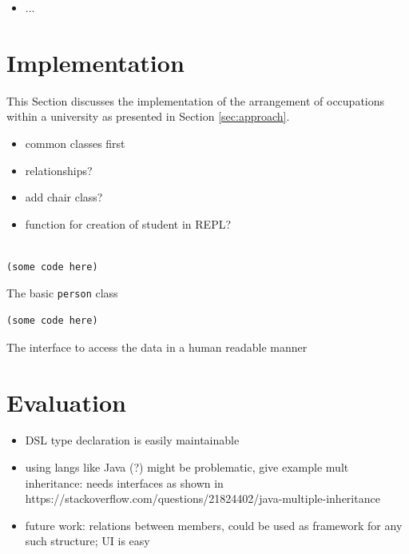 \documentclass[oribibl]{llncs}
\begin{document}
\begin{itemize}
\item ...
\end{itemize}


\section{Implementation}
\label{sec:implementation}

This Section discusses the implementation of the arrangement of occupations within a university as presented in Section \ref{sec:approach}. 

\begin{itemize}
\item common classes first
\item relationships?
\item add chair class?
\item function for creation of student in REPL?

\end{itemize}

\begin{listing}[]%
\begin{verbatim}

(some code here)
\end{verbatim}
\caption{The basic \texttt{person} class }
\label{lst:clossyntax}
\end{listing}

\begin{listing}[]%
\begin{verbatim}
(some code here)
\end{verbatim}
\caption{The interface to access the data in a human readable manner}
\label{lst:clossyntax}
\end{listing}


\section{Evaluation}
\label{sec:evaluation}

\begin{itemize}
\item DSL type declaration is easily maintainable
\item using langs like Java (?) might be problematic, give example mult inheritance: needs interfaces as shown in https://stackoverflow.com/questions/21824402/java-multiple-inheritance
\item future work: relations between members, could be used as framework for any such structure; UI is easy 
\end{itemize}
\end{document}
